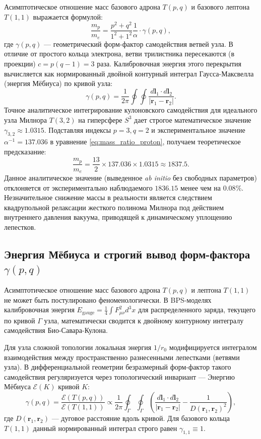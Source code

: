 \documentclass[12pt,a4paper]{article}
\begin{document}
Асимптотическое отношение масс базового адрона $T(p,q)$ и базового лептона $T(1,1)$ выражается формулой:
\begin{equation}
\frac{m_p}{m_e} = \frac{p^2 + q^2}{1^2 + 1^2} \frac{1}{\alpha} \cdot \gamma(p,q),
\label{eq:mass_ratio_proton}
\end{equation}
где $\gamma(p,q)$ — геометрический форм-фактор самодействия ветвей узла. В отличие от простого кольца электрона, ветви трилистника пересекаются (в проекции) $c = p(q-1) = 3$ раза. Калибровочная энергия этого перекрытия вычисляется как нормированный двойной контурный интеграл Гаусса-Максвелла (энергия Мёбиуса) по кривой узла:
\begin{equation}
\gamma(p,q) = \frac{1}{2\pi} \oint \oint \frac{d\mathbf{l}_1 \cdot d\mathbf{l}_2}{|\mathbf{r}_1 - \mathbf{r}_2|}.
\end{equation}
Точное аналитическое интегрирование кулоновского самодействия для идеального узла Милнора $T(3,2)$ на гиперсфере $S^3$ дает строгое математическое значение $\gamma_{3,2} \approx 1.0315$.
Подставляя индексы $p=3, q=2$ и экспериментальное значение $\alpha^{-1} = 137.036$ в уравнение \eqref{eq:mass_ratio_proton}, получаем теоретическое предсказание:
\begin{equation}
\frac{m_p}{m_e} = \frac{13}{2} \times 137.036 \times 1.0315 \approx 1837.5.
\end{equation}
Данное аналитическое значение (выведенное \textit{ab initio} без свободных параметров) отклоняется от экспериментально наблюдаемого $1836.15$ менее чем на $0.08\%$. Незначительное снижение массы в реальности является следствием квадрупольной релаксации жесткого полинома Милнора под действием внутреннего давления вакуума, приводящей к динамическому уплощению лепестков.

\subsection{Энергия Мёбиуса и строгий вывод форм-фактора $\gamma(p,q)$}
Асимптотическое отношение масс базового адрона $T(p,q)$ и лептона $T(1,1)$ не может быть постулировано феноменологически. В BPS-моделях калибровочная энергия $E_{\text{gauge}} = \frac{1}{4}\int F_{\mu\nu}^2 d^3x$ для распределенного заряда, текущего по кривой $\Gamma$ узла, математически сводится к двойному контурному интегралу самодействия Био-Савара-Кулона.

Для узла сложной топологии локальная энергия $1/r_0$ модифицируется интегралом взаимодействия между пространственно разнесенными лепестками (ветвями узла). В дифференциальной геометрии безразмерный форм-фактор такого самодействия регуляризуется через топологический инвариант — Энергию Мёбиуса $\mathcal{E}(K)$ кривой $K$:
\begin{equation}
\gamma(p,q) = \frac{\mathcal{E}(T(p,q))}{\mathcal{E}(T(1,1))} \propto \frac{1}{2\pi} \oint_{\Gamma} \oint_{\Gamma} \left( \frac{d\mathbf{l}_1 \cdot d\mathbf{l}_2}{|\mathbf{r}_1 - \mathbf{r}_2|} - \frac{1}{D(\mathbf{r}_1, \mathbf{r}_2)^2} \right),
\end{equation}
где $D(\mathbf{r}_1, \mathbf{r}_2)$ — дуговое расстояние вдоль кривой. 
Для базового кольца $T(1,1)$ данный нормированный интеграл строго равен $\gamma_{1,1} \equiv 1$. 
\end{document}
